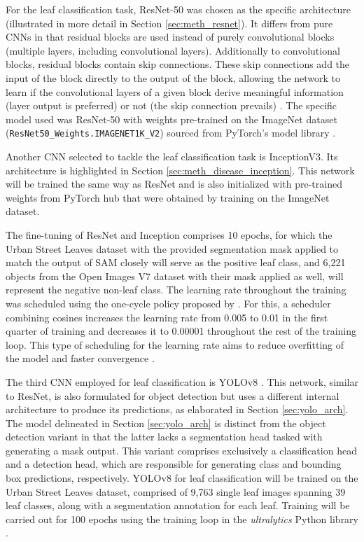 \documentclass[draft,final]{vutinfth} %
\begin{document}
For the leaf classification task, ResNet-50 was chosen as the specific architecture (illustrated in more detail in Section \ref{sec:meth_resnet}). It differs from pure CNNs in that residual blocks are used instead of purely convolutional blocks (multiple layers, including convolutional layers). Additionally to convolutional blocks, residual blocks contain skip connections. These skip connections add the input of the block directly to the output of the block, allowing the network to learn if the convolutional layers of a given block derive meaningful information (layer output is preferred) or not (the skip connection prevails) \cite{he_deep_2015, choudhary_comprehensive_2023}.
The specific model used was ResNet-50 with weights pre-trained on the ImageNet dataset \cite{deng_imagenet_2009} (\verb |ResNet50_Weights.IMAGENET1K_V2|) sourced from PyTorch's model library \cite{paszke_pytorch_2019}. 

Another CNN selected to tackle the leaf classification task is InceptionV3. Its architecture is highlighted in Section \ref{sec:meth_disease_inception}. This network will be trained the same way as ResNet and is also initialized with pre-trained weights from PyTorch hub \cite{paszke_pytorch_2019} that were obtained by training on the ImageNet \cite{deng_imagenet_2009} dataset.

The fine-tuning of ResNet and Inception comprises 10 epochs, for which the Urban Street Leaves dataset \cite{yang_urban_2023} with the provided segmentation mask applied to match the output of SAM closely will serve as the positive leaf class, and 6,221 objects from the Open Images V7 dataset \cite{kuznetsova_open_2020} with their mask applied as well, will represent the negative non-leaf class. The learning rate throughout the training was scheduled using the one-cycle policy proposed by \citeauthor{smith_super-convergence_2018}. For this, a scheduler combining cosines increases the learning rate from 0.005 to 0.01 in the first quarter of training and decreases it to 0.00001 throughout the rest of the training loop. This type of scheduling for the learning rate aims to reduce overfitting of the model and faster convergence \cite{smith_super-convergence_2018}.

The third CNN employed for leaf classification is YOLOv8 \cite{yao_hp-yolov8_2024}. This network, similar to ResNet, is also formulated for object detection but uses a different internal architecture to produce its predictions, as elaborated in Section \ref{sec:yolo_arch}. The model delineated in Section \ref{sec:yolo_arch} is distinct from the object detection variant in that the latter lacks a segmentation head tasked with generating a mask output. This variant comprises exclusively a classification head and a detection head, which are responsible for generating class and bounding box predictions, respectively.
YOLOv8 for leaf classification will be trained on the Urban Street Leaves \cite{yang_urban_2023} dataset, comprised of 9,763 single leaf images spanning 39 leaf classes, along with a segmentation annotation for each leaf. Training will be carried out for 100 epochs using the training loop in the \textit{ultralytics} Python library \cite{jocher_ultralytics_2023}.
\end{document}
